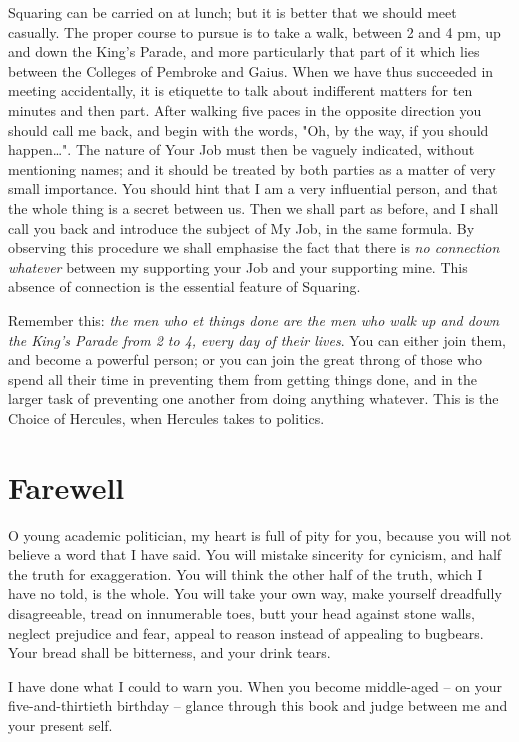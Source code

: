 \documentclass[12pt, oneside, b5paper]{memoir}
\begin{document}
Squaring can be carried on at lunch; but it is better that we should meet casually. The proper course to pursue is to take a walk, between 2 and 4 pm, up and down the King's Parade, and more particularly that part of it which lies between the Colleges of Pembroke and Gaius. When we have thus succeeded in meeting accidentally, it is etiquette to talk about indifferent matters for ten minutes and then part. After walking five paces in the opposite direction you should call me back, and begin with the words, "Oh, by the way, if you should happen\dots". The nature of Your Job must then be vaguely indicated, without mentioning names; and it should be treated by both parties as a matter of very small importance. You should hint that I am a very influential person, and that the whole thing is a secret between us. Then we shall part as before, and I shall call you back and introduce the subject of My Job, in the same formula. By observing this procedure we shall emphasise the fact that there is \emph{no connection whatever} between my supporting your Job and your supporting mine. This absence of connection is the essential feature of Squaring.

Remember this: \emph{the men who et things done are the men who walk up and down the King's Parade from 2 to 4, every day of their lives}. You can either join them, and become a powerful person; or you can join the great throng of those who spend all their time in preventing them from getting things done, and in the larger task of preventing one another from doing anything whatever. This is the Choice of Hercules, when Hercules takes to politics.

\chapter{Farewell}

O young academic politician, my heart is full of pity for you, because you will not believe a word that I have said. You will mistake sincerity for cynicism, and half the truth for exaggeration. You will think the other half of the truth, which I have no told, is the whole. You will take your own way, make yourself dreadfully disagreeable, tread on innumerable toes, butt your head against stone walls, neglect prejudice and fear, appeal to reason instead of appealing to bugbears. Your bread shall be bitterness, and your drink tears.

I have done what I could to warn you. When you become middle-aged -- on your five-and-thirtieth birthday -- glance through this book and judge between me and your present self.
\end{document}
